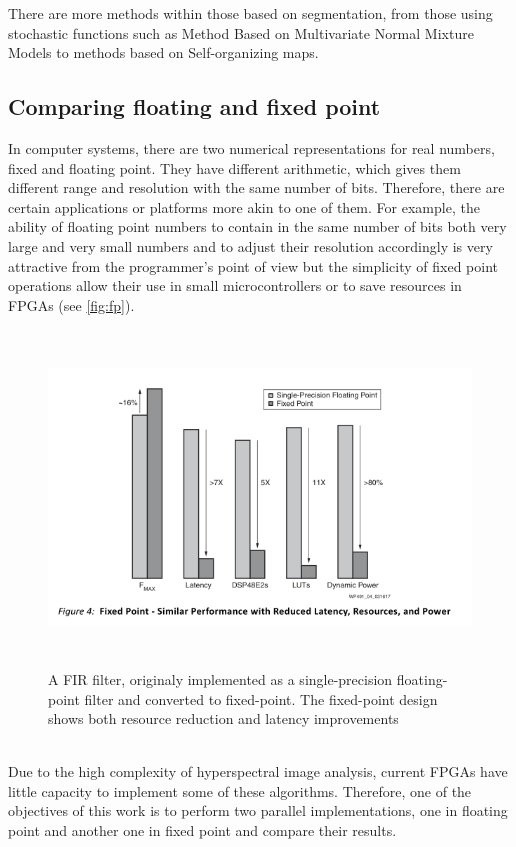 There are more methods within those based on segmentation, from those using stochastic functions such as Method Based on Multivariate Normal Mixture Models to methods based on Self-organizing maps.
\pagebreak
\subsection{Comparing floating and fixed point}
\label{makereference}

In computer systems, there are two numerical representations for real numbers, fixed and floating point. They have different arithmetic, which gives them different range and resolution with the same number of bits. Therefore, there are certain applications or platforms more akin to one of them. For example, the ability of floating point numbers to contain in the same number of bits both very large and very small numbers and to adjust their resolution accordingly is very attractive from the programmer's point of view but the simplicity of fixed point operations allow their use in small microcontrollers or to save resources in FPGAs (see \autoref{fig:fp}).
\begin{figure}[h!]
\centering
\includegraphics[height=3.5in]{figures/fp_vs_fp.png}
\caption[Performance comparison between fixed and floating point]{A FIR filter, originaly implemented as a single-precision floating-point filter and converted to fixed-point. The fixed-point design shows both resource reduction and latency improvements}
  \label{fig:fp}
\end{figure}
\\
Due to the high complexity of hyperspectral image analysis, current FPGAs have little capacity to implement some of these algorithms. Therefore, one of the objectives of this work is to perform two parallel implementations, one in floating point and another one in fixed point and compare their results.

